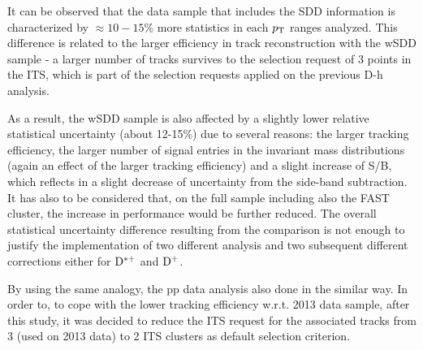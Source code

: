 It can be observed that the data sample that includes the SDD information is characterized by $\approx 10-15\%$ more statistics in each $p_{\rm T}$ ranges analyzed. This difference is related to the larger efficiency in track reconstruction with the wSDD sample - a larger number of tracks survives to the selection request of 3 points in the ITS, which is part of the selection requests applied on the previous D-h analysis.

As a result, the wSDD sample is also affected by a slightly lower relative statistical uncertainty (about 12-15\%) due to several reasons: the larger tracking efficiency, the larger number of signal entries in the invariant mass distributions (again an effect of the larger tracking efficiency) and a slight increase of S/B, which reflects in a slight decrease of uncertainty from the side-band subtraction.
It has also to be considered that, on the full sample including also the FAST cluster, the increase in performance would be further reduced.
The overall statistical uncertainty difference resulting from the comparison is not enough to justify the implementation of two different analysis and two subsequent different corrections either for ${\rm D^{*+}}$ and ${\rm D^+}$. 

By using the same analogy, the pp data analysis also done in the similar way.
In order to, to cope with the lower tracking efficiency w.r.t. 2013 data sample, after this study, it was decided to reduce the ITS request for the associated tracks from 3 (used on 2013 data) to 2 ITS clusters as default selection criterion.


